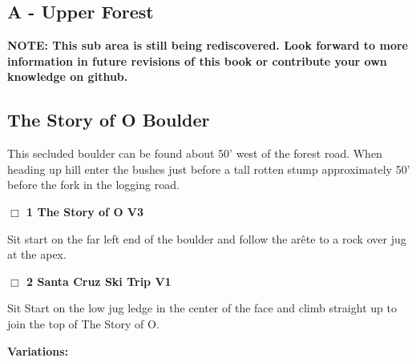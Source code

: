 	\begin{multicols}{2}

\section{A - Upper Forest}\label{sa:Upper Forest}

\textbf{NOTE: This sub area is still being rediscovered. Look forward to more information in future revisions of this book or contribute your own knowledge on github.}\\




\needspace{10em}
\subsection*{The Story of O Boulder}\label{bf:The Story of O Boulder}

This secluded boulder can be found about 50' west of the forest road. When heading up hill enter the bushes just before a tall rotten stump approximately 50' before the fork in the logging road.\\



\needspace{2em}
\label{rt:The Story of O}
\colorbox{green!20}{
\parbox{0.95\linewidth}{
\hspace{-1ex}\textbf{$\Box$
1 The Story of O V3  
}}}
\begin{adjustwidth}{1.3em}{}			

Sit start on the far left end of the boulder and follow the arête to a rock over jug at the apex.
\end{adjustwidth}




\needspace{2em}
\label{rt:Santa Cruz Ski Trip}
\colorbox{green!20}{
\parbox{0.95\linewidth}{
\hspace{-1ex}\textbf{$\Box$
2 Santa Cruz Ski Trip V1  
}}}
\begin{adjustwidth}{1.3em}{}			

Sit Start on the low jug ledge in the center of the face and climb straight up to join the top of The Story of O.
\end{adjustwidth}


\begin{adjustwidth}{0.5cm}{}				
\needspace{4em}
\textbf{Variations:} \newline


\end{adjustwidth}
\end{multicols}
